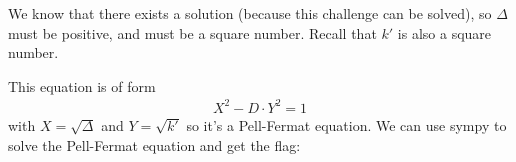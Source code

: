 \documentclass[]{article}
\begin{document}
We know that there exists a solution (because this challenge can be solved), so $\Delta$ must be positive, and must be a square number. Recall that $k'$ is also a square number.

This equation is of form
\begin{align*}
    X^2 - D \cdot Y^2 = 1
\end{align*}
with $X = \sqrt{\Delta}$ and $Y = \sqrt{k'}$
so it's a Pell-Fermat equation. We can use sympy to solve the Pell-Fermat equation and get the flag:

\inputminted{python}{solve_problemeuh.py}
\end{document}
